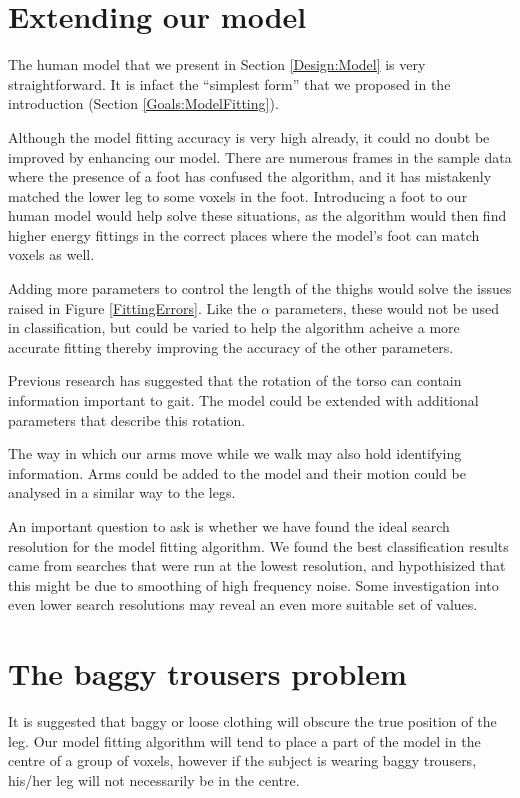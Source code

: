 \section{Extending our model}

The human model that we present in Section \ref{Design:Model} is very straightforward.
It is infact the ``simplest form'' that we proposed in the introduction (Section \ref{Goals:ModelFitting}).

Although the model fitting accuracy is very high already, it could no doubt be improved by enhancing our model.
There are numerous frames in the sample data where the presence of a foot has confused the algorithm, and it has mistakenly matched the lower leg to some voxels in the foot.
Introducing a foot to our human model would help solve these situations, as the algorithm would then find higher energy fittings in the correct places where the model's foot can match voxels as well.

Adding more parameters to control the length of the thighs would solve the issues raised in Figure \ref{FittingErrors}.
Like the $\alpha$ parameters, these would not be used in classification, but could be varied to help the algorithm acheive a more accurate fitting thereby improving the accuracy of the other parameters.

Previous research has suggested that the rotation of the torso can contain information important to gait.
The model could be extended with additional parameters that describe this rotation.

The way in which our arms move while we walk may also hold identifying information.
Arms could be added to the model and their motion could be analysed in a similar way to the legs.

An important question to ask is whether we have found the ideal search resolution for the model fitting algorithm.
We found the best classification results came from searches that were run at the lowest resolution, and hypothisized that this might be due to smoothing of high frequency noise.
Some investigation into even lower search resolutions may reveal an even more suitable set of values.


\section{The baggy trousers problem}
\label{FutureWork:BaggyTrousers}

It is suggested that baggy or loose clothing will obscure the true position of the leg.
Our model fitting algorithm will tend to place a part of the model in the centre of a group of voxels, however if the subject is wearing baggy trousers, his/her leg will not necessarily be in the centre.

